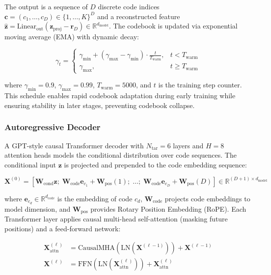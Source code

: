 \documentclass[lettersize,journal]{IEEEtran}
\begin{document}
The output is a sequence of $D$ discrete code indices $\mathbf{c} = (c_1, \ldots, c_D) \in \{1, \ldots, K\}^D$ and a reconstructed feature $\hat{\mathbf{z}} = \text{Linear}_{\text{out}}(\mathbf{z}_{\text{proj}} - \mathbf{r}_D) \in \mathbb{R}^{d_{\text{model}}}$. The codebook is updated via exponential moving average (EMA) with dynamic decay:

\begin{equation}
\label{eq:ema}
\gamma_t = \begin{cases}
\gamma_{\text{min}} + (\gamma_{\text{max}} - \gamma_{\text{min}}) \cdot \frac{t}{T_{\text{warm}}}, & t < T_{\text{warm}} \\
\gamma_{\text{max}}, & t \geq T_{\text{warm}}
\end{cases}
\end{equation}

where $\gamma_{\text{min}} = 0.9$, $\gamma_{\text{max}} = 0.99$, $T_{\text{warm}} = 5000$, and $t$ is the training step counter. This schedule enables rapid codebook adaptation during early training while ensuring stability in later stages, preventing codebook collapse.

\subsubsection{Autoregressive Decoder}

A GPT-style causal Transformer decoder with $N_{\text{tar}} = 6$ layers and $H = 8$ attention heads models the conditional distribution over code sequences. The conditional input $\mathbf{z}$ is projected and prepended to the code embedding sequence:

\begin{equation}
\label{eq:tar_input}
\mathbf{X}^{(0)} = [\mathbf{W}_{\text{cond}} \mathbf{z};\; \mathbf{W}_{\text{code}} \mathbf{e}_{c_1} + \mathbf{W}_{\text{pos}}(1);\; \ldots;\; \mathbf{W}_{\text{code}} \mathbf{e}_{c_D} + \mathbf{W}_{\text{pos}}(D)] \in \mathbb{R}^{(D+1) \times d_{\text{model}}}
\end{equation}

where $\mathbf{e}_{c_d} \in \mathbb{R}^{d_{\text{code}}}$ is the embedding of code $c_d$, $\mathbf{W}_{\text{code}}$ projects code embeddings to model dimension, and $\mathbf{W}_{\text{pos}}$ provides Rotary Position Embedding (RoPE). Each Transformer layer applies causal multi-head self-attention (masking future positions) and a feed-forward network:

\begin{equation}
\label{eq:tar_layer}
\begin{aligned}
\mathbf{X}^{(\ell)}_{\text{attn}} &= \text{CausalMHA}(\text{LN}(\mathbf{X}^{(\ell-1)})) + \mathbf{X}^{(\ell-1)} \\
\mathbf{X}^{(\ell)} &= \text{FFN}(\text{LN}(\mathbf{X}^{(\ell)}_{\text{attn}})) + \mathbf{X}^{(\ell)}_{\text{attn}}
\end{aligned}
\end{equation}
\end{document}
